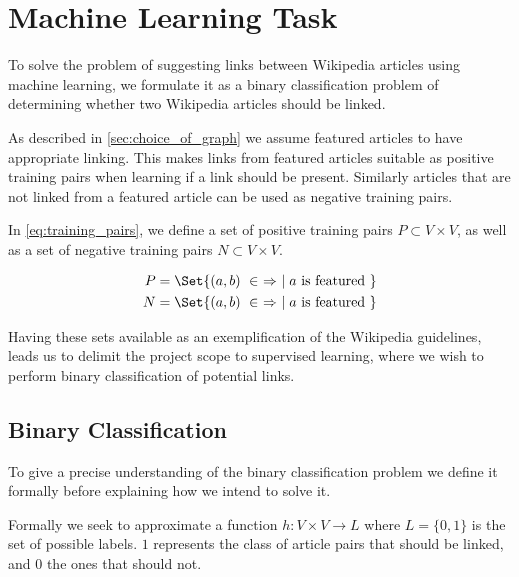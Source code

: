 \section{Machine Learning Task}\label{sec:machine_learning_task}
To solve the problem of suggesting links between Wikipedia articles using machine learning, we formulate it as a binary classification problem of determining whether two Wikipedia articles should be linked.

As described in \cref{sec:choice_of_graph} we assume featured articles to have appropriate linking. This makes links from featured articles suitable as positive training pairs when learning if a link should be present. Similarly articles that are not linked from a featured article can be used as negative training pairs.

In \cref{eq:training_pairs}, we define a set of positive training pairs $P \subset V \times V$, as well as a set of negative training pairs $N \subset V \times V$.

\begin{equation}
\label{eq:training_pairs}
  \begin{split}
    P &= \Set{(a,b)\ \in\ \Rightarrow\ \mid a\text{ is featured}\ } \\
    N &= \Set{(a,b)\ \in\ \Rightarrow\ \mid a\text{ is featured}\ }
  \end{split}
\end{equation}

Having these sets available as an exemplification of the Wikipedia guidelines, leads us to delimit the project scope to supervised learning, where we wish to perform binary classification of potential links.


\subsection{Binary Classification}\label{sec:ml_def}
To give a precise understanding of the binary classification problem we define it formally before explaining how we intend to solve it.

Formally we seek to approximate a function $h: V \times V \to L$ where $L=\{0,1\}$ is the set of possible labels. $1$ represents the class of article pairs that should be linked, and $0$ the ones that should not.

